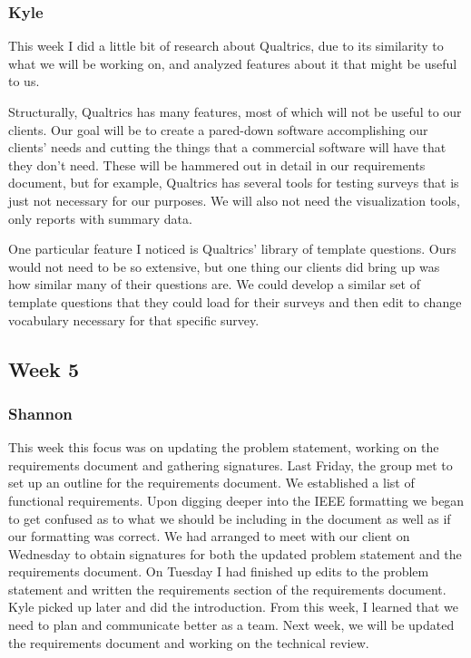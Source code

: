 \documentclass[letterpaper,10pt,serif, draftclsnofoot,onecolumn, compsoc, titlepage]{IEEEtran}
\begin{document}
\subsubsection{Kyle}
This week I did a little bit of research about Qualtrics, due to its similarity to what we will be working on, and analyzed features about it that might be useful to us.

Structurally, Qualtrics has many features, most of which will not be useful to our clients. Our goal will be to create a pared-down software accomplishing our clients' needs and cutting the things that a commercial software will have that they don't need. These will be hammered out in detail in our requirements document, but for example, Qualtrics has several tools for testing surveys that is just not necessary for our purposes. We will also not need the visualization tools, only reports with summary data.

One particular feature I noticed is Qualtrics' library of template questions. Ours would not need to be so extensive, but one thing our clients did bring up was how similar many of their questions are. We could develop a similar set of template questions that they could load for their surveys and then edit to change vocabulary necessary for that specific survey.
\subsection{Week 5}
\subsubsection{Shannon}
This week this focus was on updating the problem statement, working on the requirements document and gathering signatures. Last Friday, the group met to set up an outline for the requirements document. We established a list of functional requirements. Upon digging deeper into the IEEE formatting we began to get confused as to what we should be including in the document as well as if our formatting was correct. We had arranged to meet with our client on Wednesday to obtain signatures for both the updated problem statement and the requirements document. On Tuesday I had finished up edits to the problem statement and written the requirements section of the requirements document. Kyle picked up later and did the introduction. From this week, I learned that we need to plan and communicate better as a team. Next week, we will be updated the requirements document and working on the technical review.
\end{document}
